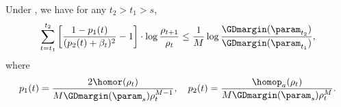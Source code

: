\begin{lemma}
\label{lem: Bound of beta in GD}
Under , we have for any $t_2>t_1 >s$,
\begin{equation}
\label{eq: bound of beta in GD}
    \sum_{t=t_1}^{t_2} \bigg[ \frac{1-p_1(t)}{(p_2(t)+\beta_t)^2} -1\bigg] \cdot \log \frac{\rho_{t+1}}{\rho_t} \le \frac{1}{M} \log \frac{\GDmargin(\param_{t_2})}{\GDmargin(\param_{t_1})},
\end{equation}
where 
\[
p_1(t) = \frac{2\homor (\rho_t)}{M\GDmargin(\param_s) \rho^{M-1}_t}, \quad p_2(t) = \frac{ \homop_a(\rho_t)}{M\GDmargin(\param_s) \rho^{M}_t}.  
\] 
\end{lemma}
